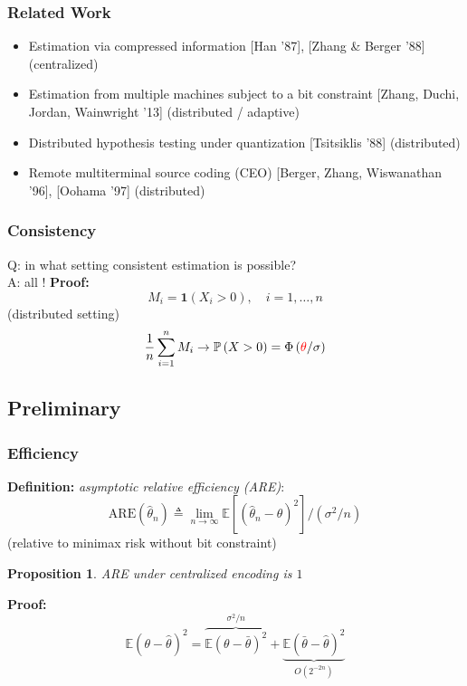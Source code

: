\documentclass[mathserif]{beamer}
\newcommand{\thetac}{{\color{red} \theta}}
\newtheorem{prop}{Proposition}
\newcommand{\Prob}{\mathbb{P}}
\begin{document}
\begin{frame}
\frametitle{Related Work}
\begin{itemize} 
\pause
\item Estimation via compressed information [Han '87], [Zhang \& Berger '88] (centralized)
\pause
\item Estimation from multiple machines subject to a bit constraint [Zhang, Duchi, Jordan, Wainwright '13] (distributed / adaptive)
\pause
\item Distributed hypothesis testing under quantization [Tsitsiklis '88] (distributed)
\pause
\item Remote multiterminal source coding (CEO) [Berger, Zhang, Wiswanathan '96], [Oohama '97] (distributed)
\end{itemize}
\end{frame}

\begin{frame}
\frametitle{Consistency}
Q: in what setting consistent estimation is possible? \\
\bigskip
\pause
A: all ! 
\pause
\bigskip
\textbf{Proof:}
\[
M_i = \mathbf 1(X_i>0),\quad i=1,\ldots,n
\]
(distributed setting)
\pause
\[
\frac{1}{n}\sum_{i=1}^n M_i \rightarrow \Prob\left(X>0 \right) = \Phi\left(\thetac / \sigma \right)
\]
\end{frame}


\subsection{Preliminary}

\begin{frame}
\frametitle{Efficiency}
\textbf{Definition:} \emph{asymptotic relative efficiency (ARE)}:
\[
\mathrm{ARE}(\widehat{\theta}_n) \triangleq \lim_{n\rightarrow \infty} \mathbb E \left[ \left(\widehat{\theta}_n-\theta \right)^2 \right] / \left(\sigma^2 / n \right)
\]
(relative to minimax risk without bit constraint)
\bigskip

\pause
\begin{prop} ARE under centralized encoding is $1$
\end{prop}
\pause
\textbf{Proof:}
\[
\mathbb E \left( \theta- \widehat{\theta} \right)^2 = \overbrace{\mathbb E \left( \theta- \bar{\theta} \right)^2}^{\sigma^2/n} + \underbrace{\mathbb E \left( \bar{\theta}- \widehat{\theta} \right)^2}_{O(2^{-2n})}
\]

\end{frame}
\end{document}

